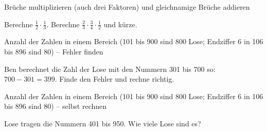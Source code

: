 \begin{aufgabe}{Brüche multiplizieren (auch drei Faktoren) und gleichnamige Brüche addieren}
\begin{teile}
\teil Berechne $\frac{1}{2} \cdot \frac{1}{3}$.
\teil Berechne $\frac{2}{3} \cdot \frac{3}{4} \cdot \frac{1}{2}$ und kürze.
\end{teile}
\end{aufgabe}

\begin{aufgabe}{Anzahl der Zahlen in einem Bereich (101 bis 900 sind 800 Lose; Endziffer 6 in 106 bis 896 sind 80) – Fehler finden}
\begin{teile}
\teil Ben berechnet die Zahl der Lose mit den Nummern 301 bis 700 so: $700 - 301 = 399$. Finde den Fehler und rechne richtig.
\end{teile}
\end{aufgabe}

\begin{aufgabe}{Anzahl der Zahlen in einem Bereich (101 bis 900 sind 800 Lose; Endziffer 6 in 106 bis 896 sind 80) – selbst rechnen}
\begin{teile}
\teil Lose tragen die Nummern 401 bis 950. Wie viele Lose sind es?
\end{teile}
\end{aufgabe}
